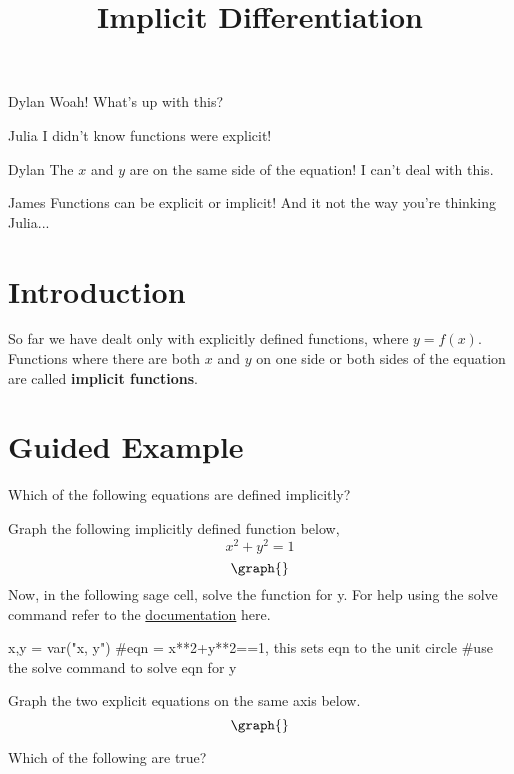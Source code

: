 \documentclass{ximera}
\title{Implicit Differentiation}
\begin{document}
\maketitle
\begin{dialogue}
\item[Dylan] Woah! What's up with this?
\item[Julia] I didn't know functions were explicit!
\item[Dylan] The $x$ and $y$ are on the same side of the equation! I can't deal with this.
\item[James] Functions can be explicit or implicit! And it not the way you're thinking Julia...
\end{dialogue}
\section{Introduction}
So far we have dealt only with explicitly defined functions, where $y=f(x)$.  Functions where there are both $x$ and $y$ on one side or both sides of the equation are called \textbf{implicit functions}.
\section{Guided Example}
\begin{question}
Which of the following equations are defined implicitly?
\begin{selectAll}
\end{selectAll}
\end{question}
Graph the following implicitly defined function below, $$x^2+y^2=1$$
\[
\graph{}
\]
Now, in the following sage cell, solve the function for y. For help using the solve command refer to the \href{http://doc.sagemath.org/html/en/tutorial/tour_algebra.html#solving-equations}{documentation} here.
\begin{onlineOnly}
\begin{sageCell}
x,y = var("x, y")
#eqn = x**2+y**2==1, this sets eqn to the unit circle
#use the solve command to solve eqn for y
\end{sageCell}
\end{onlineOnly}
Graph the two explicit equations on the same axis below.
\[
\graph{}
\]
\begin{question}
Which of the following are true?
\begin{selectAll}
\end{selectAll}
\end{question}
\end{document}

